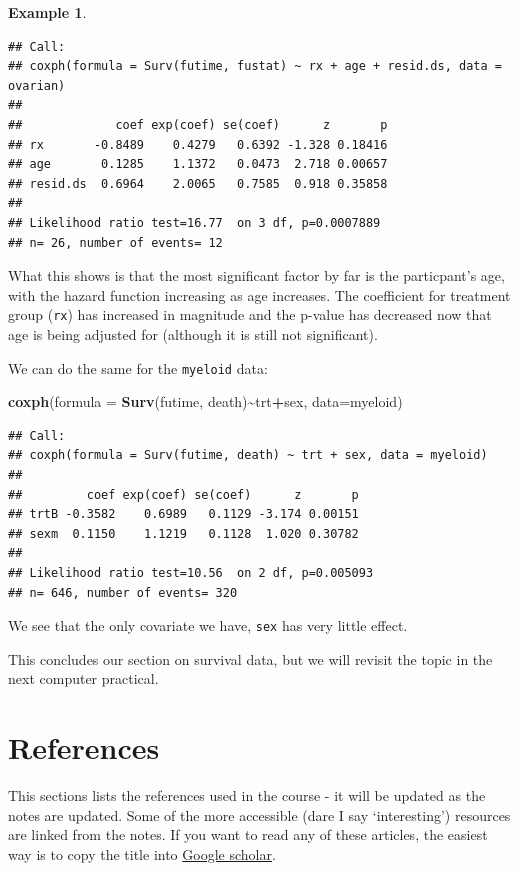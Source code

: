\documentclass[
  openany]{book}
\newenvironment{Shaded}{\begin{snugshade}}{\end{snugshade}}
\newcommand{\AttributeTok}[1]{\textcolor[rgb]{0.13,0.29,0.53}{#1}}
\newcommand{\FunctionTok}[1]{\textcolor[rgb]{0.13,0.29,0.53}{\textbf{#1}}}
\newcommand{\NormalTok}[1]{#1}
\newcommand{\SpecialCharTok}[1]{\textcolor[rgb]{0.81,0.36,0.00}{\textbf{#1}}}
\theoremstyle{definition}
\theoremstyle{definition}
\newtheorem{example}{Example}[chapter]
\theoremstyle{definition}
\theoremstyle{definition}
\theoremstyle{remark}
\begin{document}
\begin{example}
\begin{verbatim}
## Call:
## coxph(formula = Surv(futime, fustat) ~ rx + age + resid.ds, data = ovarian)
## 
##             coef exp(coef) se(coef)      z       p
## rx       -0.8489    0.4279   0.6392 -1.328 0.18416
## age       0.1285    1.1372   0.0473  2.718 0.00657
## resid.ds  0.6964    2.0065   0.7585  0.918 0.35858
## 
## Likelihood ratio test=16.77  on 3 df, p=0.0007889
## n= 26, number of events= 12
\end{verbatim}

What this shows is that the most significant factor by far is the particpant's age, with the hazard function increasing as age increases. The coefficient for treatment group (\texttt{rx}) has increased in magnitude and the p-value has decreased now that age is being adjusted for (although it is still not significant).

We can do the same for the \texttt{myeloid} data:

\begin{Shaded}
\begin{Highlighting}[]
\FunctionTok{coxph}\NormalTok{(}\AttributeTok{formula =} \FunctionTok{Surv}\NormalTok{(futime, death)}\SpecialCharTok{\textasciitilde{}}\NormalTok{trt}\SpecialCharTok{+}\NormalTok{sex, }\AttributeTok{data=}\NormalTok{myeloid)}
\end{Highlighting}
\end{Shaded}

\begin{verbatim}
## Call:
## coxph(formula = Surv(futime, death) ~ trt + sex, data = myeloid)
## 
##         coef exp(coef) se(coef)      z       p
## trtB -0.3582    0.6989   0.1129 -3.174 0.00151
## sexm  0.1150    1.1219   0.1128  1.020 0.30782
## 
## Likelihood ratio test=10.56  on 2 df, p=0.005093
## n= 646, number of events= 320
\end{verbatim}

We see that the only covariate we have, \texttt{sex} has very little effect.
\end{example}

This concludes our section on survival data, but we will revisit the topic in the next computer practical.

\hypertarget{references}{%
\chapter*{References}\label{references}}

This sections lists the references used in the course - it will be updated as the notes are updated. Some of the more accessible (dare I say `interesting') resources are linked from the notes. If you want to read any of these articles, the easiest way is to copy the title into \href{https://scholar.google.co.uk/}{Google scholar}.

  
\end{document}
